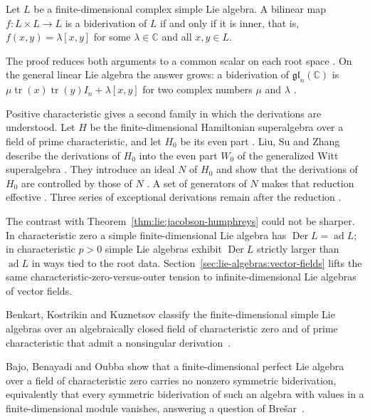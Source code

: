 \begin{theorem}\label{thm:lie:tang-biderivation}
Let $L$ be a finite-dimensional complex simple Lie algebra. A bilinear map
$f\colon L\times L\to L$ is a biderivation of $L$ if and only if it is inner,
that is, $f(x,y)=\lambda[x,y]$ for some $\lambda\in\mathbb{C}$ and all
$x,y\in L$.
\end{theorem}

The proof reduces both arguments to a common scalar on each root space
\cite[pp.~6--7]{Tang2017Biderivations}. On the general linear Lie algebra the
answer grows: a biderivation of $\mathfrak{gl}_n(\mathbb{C})$ is
$\mu\operatorname{tr}(x)\operatorname{tr}(y)I_n+\lambda[x,y]$ for two complex
numbers $\mu$ and $\lambda$ \cite[Theorem~3.2, p.~7]{Tang2017Biderivations}.

Positive characteristic gives a second family in which the derivations are
understood. Let $H$ be the finite-dimensional Hamiltonian superalgebra over a
field of prime characteristic, and let $H_0$ be its even part
\cite[p.~1]{LiuSuZhang2005}. Liu, Su and Zhang describe the derivations of
$H_0$ into the even part $W_0$ of the generalized Witt superalgebra
\cite[p.~1]{LiuSuZhang2005}. They introduce an ideal $N$ of $H_0$ and show that
the derivations of $H_0$ are controlled by those of $N$
\cite[Theorem~2.4, p.~6]{LiuSuZhang2005}. A set of generators of $N$ makes that
reduction effective \cite[Theorem~2.7, p.~7]{LiuSuZhang2005}. Three series of
exceptional derivations remain after the reduction
\cite[p.~2]{LiuSuZhang2005}.

The contrast with Theorem~\ref{thm:lie:jacobson-humphreys} could not be
sharper.
In characteristic zero a simple finite-dimensional Lie algebra
has $\operatorname{Der} L=\operatorname{ad} L$; in characteristic $p>0$
simple Lie algebras exhibit $\operatorname{Der} L$ strictly larger than
$\operatorname{ad} L$ in ways tied to the root data.
Section~\ref{sec:lie-algebras:vector-fields} lifts the same
characteristic-zero-versus-outer tension to infinite-dimensional Lie
algebras of vector fields.

Benkart, Kostrikin and Kuznetsov classify the finite-dimensional simple Lie algebras over an algebraically closed field of characteristic zero and of prime characteristic that admit a nonsingular derivation~\cite{WlFiniteDimensionalSimpleLieAlge1995}.

Bajo, Benayadi and Oubba show that a finite-dimensional perfect Lie algebra over a field of characteristic zero carries no nonzero symmetric biderivation, equivalently that every symmetric biderivation of such an algebra with values in a finite-dimensional module vanishes, answering a question of Bre\v{s}ar~\cite{WlNonExistenceOfSymmetricBideriv2025}.

